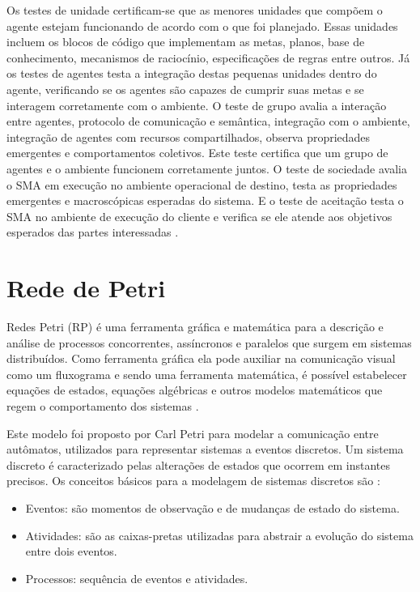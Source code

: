 Os testes de unidade certificam-se que as menores unidades que compõem o agente estejam funcionando de acordo com o que foi planejado. Essas unidades incluem os blocos de código que implementam as metas, planos, base de conhecimento, mecanismos de raciocínio, especificações de regras entre outros. Já os testes de agentes testa a integração destas pequenas unidades  dentro do agente, verificando se os agentes são capazes de cumprir suas metas e se interagem corretamente com o ambiente. O teste de grupo avalia a interação entre agentes, protocolo de comunicação e semântica, integração com o ambiente, integração de agentes com recursos compartilhados, observa propriedades emergentes e comportamentos coletivos. Este teste certifica que um grupo de agentes e o ambiente funcionem corretamente juntos. O teste de sociedade avalia o SMA em execução no ambiente operacional de destino, testa as propriedades emergentes e macroscópicas esperadas do sistema. E o teste de aceitação testa o SMA no ambiente de execução do cliente e verifica se ele atende aos objetivos esperados das partes interessadas \cite{nguyen2009thesis}.

\section{Rede de Petri}

 Redes Petri (RP) é uma ferramenta gráfica e matemática para a descrição e análise de processos concorrentes, assíncronos e paralelos que surgem em sistemas distribuídos. Como ferramenta gráfica ela pode auxiliar na comunicação visual como um fluxograma e sendo uma ferramenta matemática, é possível estabelecer equações de estados, equações algébricas e outros modelos matemáticos que regem o comportamento dos sistemas \citep{murata1989petri}. 

Este modelo foi proposto por Carl Petri para modelar a comunicação entre autômatos, utilizados para representar sistemas a eventos discretos. Um sistema discreto é caracterizado pelas alterações de estados que ocorrem em instantes precisos. Os conceitos básicos para a modelagem de sistemas discretos são \cite{cardoso1997redes}:

\begin{itemize}
\item Eventos: são momentos de observação e de mudanças de estado do sistema.
\item Atividades: são as caixas-pretas utilizadas para abstrair a evolução do sistema entre dois eventos.
\item Processos: sequência de eventos e atividades.
\end{itemize}

